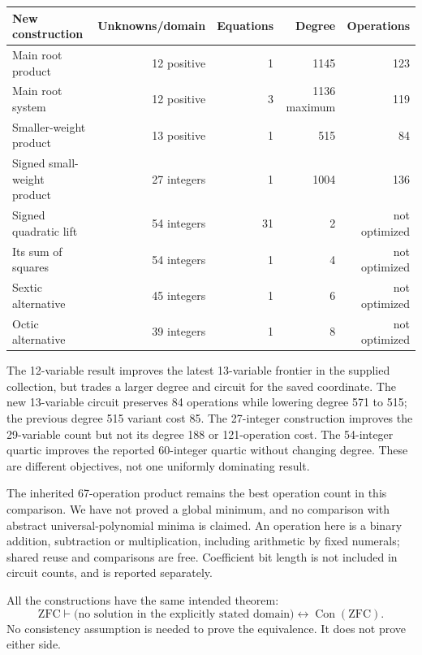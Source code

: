 \documentclass[11 pt]{article}
\newcommand{\Con}{\operatorname{Con}}
\begin{document}
\begin{center}\small
\begin{tabular}{lrrrr}
\toprule
New construction&Unknowns/domain&Equations&Degree&Operations\\
\midrule
Main root product&12 positive&1&1145&123\\
Main root system&12 positive&3&1136 maximum&119\\
Smaller-weight product&13 positive&1&515&84\\
Signed small-weight product&27 integers&1&1004&136\\
Signed quadratic lift&54 integers&31&2&not optimized\\
Its sum of squares&54 integers&1&4&not optimized\\
Sextic alternative&45 integers&1&6&not optimized\\
Octic alternative&39 integers&1&8&not optimized\\
\bottomrule
\end{tabular}
\end{center}
The 12-variable result improves the latest 13-variable frontier in the supplied collection, but trades a larger degree and circuit for the saved coordinate. The new 13-variable circuit preserves 84 operations while lowering degree 571 to 515; the previous degree 515 variant cost 85. The 27-integer construction improves the 29-variable count but not its degree 188 or 121-operation cost. The 54-integer quartic improves the reported 60-integer quartic without changing degree. These are different objectives, not one uniformly dominating result.

The inherited 67-operation product remains the best operation count in this comparison. We have not proved a global minimum, and no comparison with abstract universal-polynomial minima is claimed. An operation here is a binary addition, subtraction or multiplication, including arithmetic by fixed numerals; shared reuse and comparisons are free. Coefficient bit length is not included in circuit counts, and is reported separately.

All the constructions have the same intended theorem:
\begin{equation}\label{eq:goal}
\mathrm{ZFC}\vdash
\bigl(\text{no solution in the explicitly stated domain}\bigr)
\longleftrightarrow\Con(\mathrm{ZFC}).
\end{equation}
No consistency assumption is needed to prove the equivalence. It does not prove either side.
\end{document}
